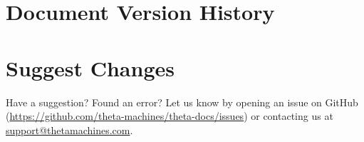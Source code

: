     \section{Document Version History}
    

    \section{Suggest Changes}    
    Have a suggestion? Found an error? Let us know by opening an issue on GitHub (\href{https://github.com/theta-machines/theta-docs/issues}{https://github.com/theta-\newline{}machines/theta-docs/issues}) or contacting us at \href{mailto:support@thetamachines.com}{support@thetamachines.com}.
    


